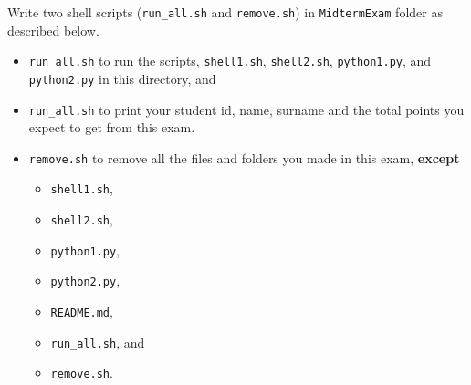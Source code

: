\question[10]

Write two shell scripts (\texttt{run\_all.sh} and \texttt{remove.sh}) in \texttt{MidtermExam} folder as described below.
\begin{itemize}
\item \texttt{run\_all.sh} to run the scripts, \texttt{shell1.sh}, \texttt{shell2.sh},  \texttt{python1.py}, and \texttt{python2.py} in this directory, and
\item \texttt{run\_all.sh} to print your student id, name, surname and the total points you expect to get from this exam.
\item \texttt{remove.sh} to remove all the files and folders you made in this exam, \textbf{except}
\begin{itemize}
\item\texttt{shell1.sh},
\item\texttt{shell2.sh},
\item\texttt{python1.py},
\item\texttt{python2.py},
\item\texttt{README.md},
\item\texttt{run\_all.sh}, and
\item\texttt{remove.sh}.
\end{itemize}
\end{itemize}


